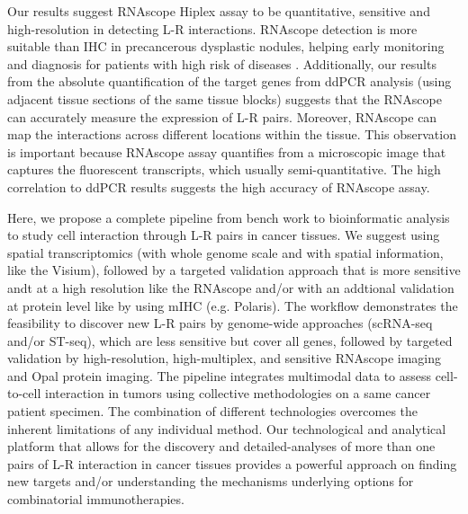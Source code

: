 Our results suggest RNAscope Hiplex assay to be quantitative, sensitive and high-resolution in detecting L-R interactions. RNAscope detection is more suitable than IHC in precancerous dysplastic nodules, helping early monitoring and diagnosis for patients with high risk of diseases \cite{bakheet2020improving}. Additionally, our results from the absolute quantification of the target genes from ddPCR analysis (using adjacent tissue sections of the same tissue blocks) suggests that the RNAscope can accurately measure the expression of L-R pairs. Moreover, RNAscope can map the interactions across different locations within the tissue. This observation is important because RNAscope assay quantifies from a microscopic image that captures the fluorescent transcripts, which usually semi-quantitative. The high correlation to ddPCR results suggests the high accuracy of RNAscope assay. 

Here, we propose a complete pipeline from bench work to bioinformatic analysis to study cell interaction through L-R pairs in cancer tissues. We suggest using spatial transcriptomics (with whole genome scale and with spatial information, like the Visium), followed by a targeted validation approach that is more sensitive andt at a high resolution like the RNAscope and/or with an addtional validation at protein level like by using mIHC (e.g. Polaris). The workflow demonstrates the feasibility to discover new L-R pairs by genome-wide approaches (scRNA-seq and/or ST-seq), which are less sensitive but cover all genes, followed by targeted validation by high-resolution, high-multiplex, and sensitive RNAscope imaging and Opal protein imaging. The pipeline integrates multimodal data to assess cell-to-cell interaction in tumors using collective methodologies on a same cancer patient specimen. The combination of different technologies overcomes the inherent limitations of any individual method. Our technological and analytical platform that allows for the discovery and detailed-analyses of more than one pairs of L-R interaction in cancer tissues provides a powerful approach on finding new targets and/or understanding the mechanisms underlying options for combinatorial immunotherapies.

